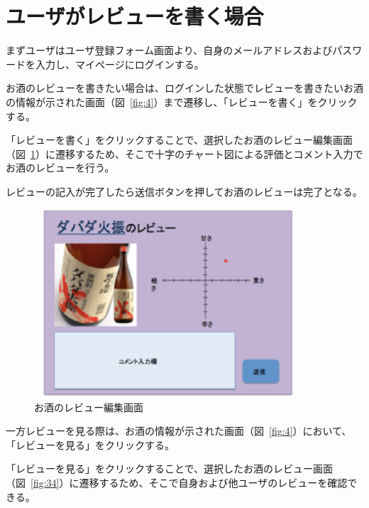 \documentclass[a4j,titlepage]{jarticle}
\begin{document}
\section{ユーザがレビューを書く場合}
まずユーザはユーザ登録フォーム画面より、自身のメールアドレスおよびパスワードを入力し、マイページにログインする。



お酒のレビューを書きたい場合は、ログインした状態でレビューを書きたいお酒の情報が示された画面（図~\ref{fig:4}）まで遷移し、「レビューを書く」をクリックする。



「レビューを書く」をクリックすることで、選択したお酒のレビュー編集画面（図~\ref{fig:33}）に遷移するため、そこで十字のチャート図による評価とコメント入力でお酒のレビューを行う。



レビューの記入が完了したら送信ボタンを押してお酒のレビューは完了となる。



\begin {figure}[!htbp]
    \begin{center}
    \includegraphics [height=7cm, width=10cm]{33.eps}
    \caption {お酒のレビュー編集画面}
    \label {fig:33}
    \end{center}
\end {figure}

\clearpage

一方レビューを見る際は、お酒の情報が示された画面（図~\ref{fig:4}）において、「レビューを見る」をクリックする。



「レビューを見る」をクリックすることで、選択したお酒のレビュー画面（図~\ref{fig:34}）に遷移するため、そこで自身および他ユーザのレビューを確認できる。
\end{document}
